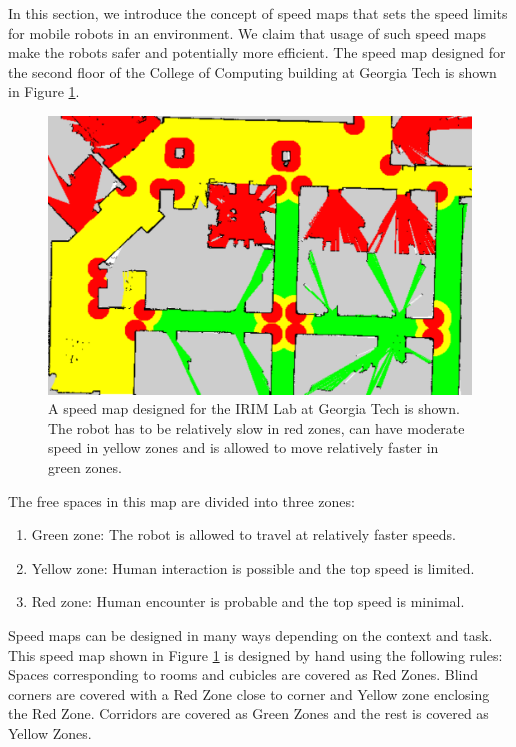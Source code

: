 In this section, we introduce the concept of speed maps that sets the speed limits for mobile robots in an environment. We claim that usage of such speed maps make the robots safer and potentially more efficient. The speed map designed for the second floor of the College of Computing building at Georgia Tech is shown in Figure \ref{fig:speed_map_irim}.

\begin{figure}[ht!]
\centering
\includegraphics[width=1.0\textwidth]{pics/intro}
\caption{A speed map designed for the IRIM Lab at Georgia Tech is shown. The robot has to be relatively slow in red zones, can have moderate speed in yellow zones and is allowed to move relatively faster in green zones.}
\label{fig:speed_map_irim}
\end{figure}

The free spaces in this map are divided into three zones:
\begin{enumerate}
\item Green zone: The robot is allowed to travel at relatively faster speeds.
\item Yellow zone: Human interaction is possible and the top speed is limited.
\item Red zone: Human encounter is probable and the top speed is minimal.
\end{enumerate}

Speed maps can be designed in many ways depending on the context and task. This speed map shown in Figure \ref{fig:speed_map_irim} is designed by hand using the following rules: Spaces corresponding to rooms and cubicles are covered as Red Zones. Blind corners are covered with a Red Zone close to corner and Yellow zone enclosing the Red Zone. Corridors are covered as Green Zones and the rest is covered as Yellow Zones. 

